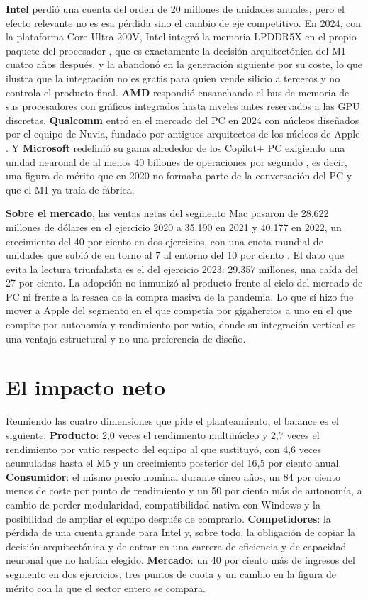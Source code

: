 \documentclass[11pt,letterpaper]{article}
\begin{document}
\textbf{Intel} perdió una cuenta del orden de 20 millones de unidades anuales,
pero el efecto relevante no es esa pérdida sino el cambio de eje competitivo.
En 2024, con la plataforma Core Ultra 200V, Intel integró la memoria LPDDR5X
en el propio paquete del procesador \autocite{intel2024lunarlake}, que es
exactamente la decisión arquitectónica del M1 cuatro años después, y la
abandonó en la generación siguiente por su coste, lo que ilustra que la
integración no es gratis para quien vende silicio a terceros y no controla el
producto final. \textbf{AMD} respondió ensanchando el bus de memoria de sus
procesadores con gráficos integrados hasta niveles antes reservados a las GPU
discretas. \textbf{Qualcomm} entró en el mercado del PC en 2024 con núcleos
diseñados por el equipo de Nuvia, fundado por antiguos arquitectos de los
núcleos de Apple \autocite{qualcomm2024}. Y \textbf{Microsoft} redefinió su
gama alrededor de los Copilot+ PC exigiendo una unidad neuronal de al menos 40
billones de operaciones por segundo \autocite{microsoft2024}, es decir, una
figura de mérito que en 2020 no formaba parte de la conversación del PC y que
el M1 ya traía de fábrica.

\textbf{Sobre el mercado}, las ventas netas del segmento Mac pasaron de 28.622
millones de dólares en el ejercicio 2020 a 35.190 en 2021 y 40.177 en 2022, un
crecimiento del 40 por ciento en dos ejercicios, con una cuota mundial de
unidades que subió de en torno al 7 al entorno del 10 por ciento
\autocite{apple10k,idc2026}. El dato que evita la lectura triunfalista es el
del ejercicio 2023: 29.357 millones, una caída del 27 por ciento. La adopción
no inmunizó al producto frente al ciclo del mercado de PC ni frente a la
resaca de la compra masiva de la pandemia. Lo que sí hizo fue mover a Apple
del segmento en el que competía por gigahercios a uno en el que compite por
autonomía y rendimiento por vatio, donde su integración vertical es una
ventaja estructural y no una preferencia de diseño.

\section{El impacto neto}

Reuniendo las cuatro dimensiones que pide el planteamiento, el balance es el
siguiente. \textbf{Producto}: 2,0 veces el rendimiento multinúcleo y 2,7 veces
el rendimiento por vatio respecto del equipo al que sustituyó, con 4,6 veces
acumuladas hasta el M5 y un crecimiento posterior del 16,5 por ciento anual.
\textbf{Consumidor}: el mismo precio nominal durante cinco años, un 84 por
ciento menos de coste por punto de rendimiento y un 50 por ciento más de
autonomía, a cambio de perder modularidad, compatibilidad nativa con Windows y
la posibilidad de ampliar el equipo después de comprarlo. \textbf{Competidores}:
la pérdida de una cuenta grande para Intel y, sobre todo, la obligación de
copiar la decisión arquitectónica y de entrar en una carrera de eficiencia y
de capacidad neuronal que no habían elegido. \textbf{Mercado}: un 40 por
ciento más de ingresos del segmento en dos ejercicios, tres puntos de cuota y
un cambio en la figura de mérito con la que el sector entero se compara.
\end{document}
